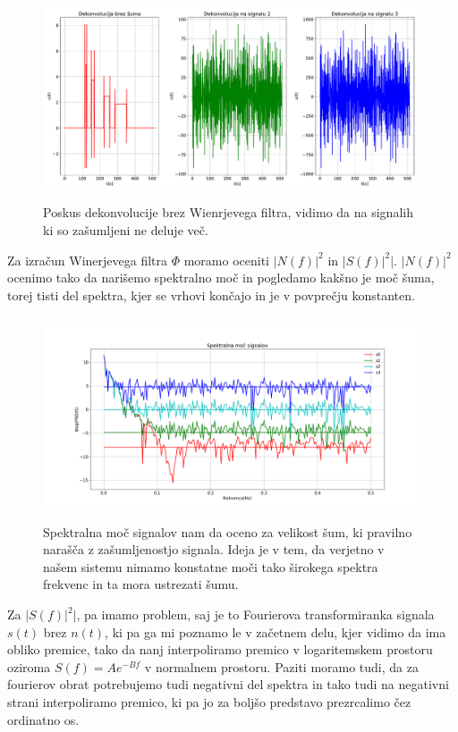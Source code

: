 \documentclass[11pt, a4paper]{article}
\begin{document}
\begin{figure}[H]
\includegraphics[width=16cm, height=6cm]{druga_drugi.pdf}
\caption{Poskus dekonvolucije brez Wienrjevega filtra, vidimo da na signalih ki so zašumljeni ne deluje več.}  
\end{figure}
Za izračun Winerjevega filtra $\Phi$ moramo oceniti $|N(f)|^2$ in $|S(f)|^2|$.  $|N(f)|^2$ ocenimo tako da narišemo spektralno moč in pogledamo kakšno je moč šuma, torej tisti del spektra, kjer se vrhovi končajo in je v povprečju konstanten. \newline\newline 
\begin{figure}[H]
\includegraphics[width=16cm, height=6cm]{druga_drugi2.png}
\caption{Spektralna moč signalov nam da oceno za velikost šum, ki pravilno narašča z zašumljenostjo signala. Ideja je v tem, da verjetno v našem sistemu nimamo konstatne moči tako širokega spektra frekvenc in ta mora ustrezati šumu.}  
\end{figure}
Za $|S(f)|^2|$, pa imamo problem, saj je to Fourierova transformiranka signala $s(t)$ brez $n(t)$, ki pa ga mi poznamo le v začetnem delu, kjer vidimo da ima obliko premice, tako da nanj interpoliramo premico v logaritemskem prostoru oziroma $S(f) = A e^{-B f}$ v normalnem prostoru.  Paziti moramo tudi, da za fourierov obrat potrebujemo tudi negativni del spektra in tako tudi na negativni strani interpoliramo premico, ki pa jo za boljšo predstavo prezrcalimo čez ordinatno os.
\end{document}
